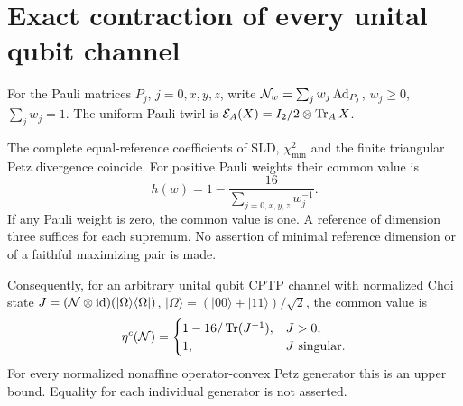 \section{Exact contraction of every unital qubit channel}\label{sec:qubit}
For the Pauli matrices \(P_j\), \(j=0,x,y,z\), write
\(\mathcal N_w=\sum_jw_j\operatorname{Ad}_{P_j}\), \(w_j\ge0\), \(\sum_jw_j=1\).
The uniform Pauli twirl is \(\mathcal E_A(X)=I_2/2\otimes\operatorname{Tr}_AX\).

\begin{theorem}\label{thm:pauli}
The complete equal-reference coefficients of SLD, \(\chi^2_{\min}\) and the finite triangular Petz divergence coincide. For positive Pauli weights their common value is
\begin{equation}\label{eq:pauli-exact}
 h(w)=1-\frac{16}{\sum_{j=0,x,y,z}w_j^{-1}}.
\end{equation}
If any Pauli weight is zero, the common value is one. A reference of dimension three suffices for each supremum. No assertion of minimal reference dimension or of a faithful maximizing pair is made.

Consequently, for an arbitrary unital qubit CPTP channel with normalized Choi state \(J=(\mathcal N\otimes\operatorname{id})(|\Omega\rangle\langle\Omega|)\), \(|\Omega\rangle=(|00\rangle+|11\rangle)/\sqrt2\), the common value is
\begin{equation}\label{eq:choi}
 \eta^c(\mathcal N)=\begin{cases}1-16/\operatorname{Tr}(J^{-1}),&J>0,\\1,&J\text{ singular}.\end{cases}
\end{equation}
For every normalized nonaffine operator-convex Petz generator this is an upper bound. Equality for each individual generator is not asserted.
\end{theorem}

